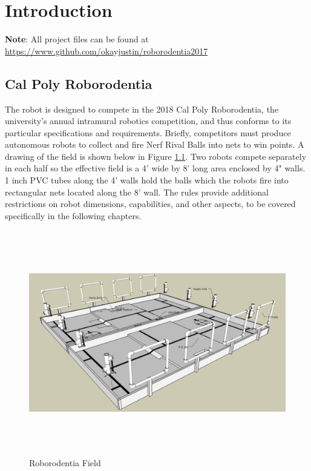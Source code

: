 \chapter{Introduction}

\textbf{Note}: All project files can be found at \url{https://www.github.com/okayjustin/roborodentia2017} \


\section{Cal Poly Roborodentia}
The robot is designed to compete in the 2018 Cal Poly Roborodentia, the university's annual intramural robotics competition, and thus conforms to its particular specifications and requirements. Briefly, competitors must produce autonomous robots to collect and fire Nerf Rival Balls into nets to win points. A drawing of the field is shown below in Figure \ref{fig:roborodentia_field}. Two robots compete separately in each half so the effective field is a 4' wide by 8' long area enclosed by 4" walls. 1 inch PVC tubes along the 4' walls hold the balls which the robots fire into rectangular nets located along the 8' wall. The rules provide additional restrictions on robot dimensions, capabilities, and other aspects, to be covered specifically in the following chapters.

\begin{figure}[H]   %
	\centering \includegraphics[width=6in, height=3.85in, keepaspectratio]{figures/roborodentia_field.png}
	\caption{Roborodentia Field \cite{roborodentia}}	\label{fig:roborodentia_field}
\end{figure}




